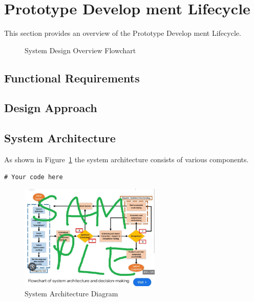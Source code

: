 \section{Prototype Develop ment Lifecycle}
This section provides an overview of the Prototype Develop ment Lifecycle.

\begin{figure}[H]
    \centering
    \scalebox{0.8}{ %
        
    }
    \caption{System Design Overview Flowchart}
    \label{fig:decriptiveLabel44} %
\end{figure}

\subsection{Functional Requirements}

\subsection{Design Approach}

\subsection{System Architecture}
As shown in Figure~\ref{fig:decriptiveLabel44} the system architecture consists of various components.

\begin{lstlisting}[style=cstyle, caption=System Architecture Code Example, label=lst:SystemArchitecture10]
# Your code here
\end{lstlisting}

\begin{figure}[htbp] %
    \centering
    \includegraphics[width=0.6\textwidth]{figures/methodology/system_architecture.jpg}
    \caption{System Architecture Diagram}
    \label{fig:system-architecture5}
\end{figure}